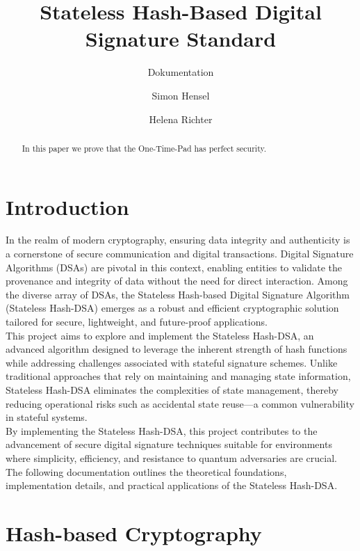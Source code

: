\documentclass[journal=tosc,notanonymous]{iacrtrans}
\author{Simon Hensel\inst{1} \and Helena Richter\inst{2}}
\institute{Albstadt-Sigmaringen University, Albstadt, Germany, \email{hensels1@hs-albsig.de} \and
	Albstadt-Sigmaringen University, Albstadt, Germany, \email{richtehe@hs-albsig.de}}
\title{Stateless Hash-Based Digital Signature Standard}
\subtitle{Dokumentation}
\begin{document}
\maketitle




\begin{abstract}
  In this paper we prove that the One-Time-Pad has perfect security.

  \lipsum[8]
\end{abstract}


\section{Introduction}

In the realm of modern cryptography, ensuring data integrity and authenticity is a cornerstone of secure communication and digital transactions. Digital Signature Algorithms (DSAs) are pivotal in this context, enabling entities to validate the provenance and integrity of data without the need for direct interaction. Among the diverse array of DSAs, the Stateless Hash-based Digital Signature Algorithm (Stateless Hash-DSA) emerges as a robust and efficient cryptographic solution tailored for secure, lightweight, and future-proof applications.
\\
This project aims to explore and implement the Stateless Hash-DSA, an advanced algorithm designed to leverage the inherent strength of hash functions while addressing challenges associated with stateful signature schemes. Unlike traditional approaches that rely on maintaining and managing state information, Stateless Hash-DSA eliminates the complexities of state management, thereby reducing operational risks such as accidental state reuse—a common vulnerability in stateful systems.
\\
By implementing the Stateless Hash-DSA, this project contributes to the advancement of secure digital signature techniques suitable for environments where simplicity, efficiency, and resistance to quantum adversaries are crucial. The following documentation outlines the theoretical foundations, implementation details, and practical applications of the Stateless Hash-DSA.

\section{Hash-based Cryptography}
\end{document}
